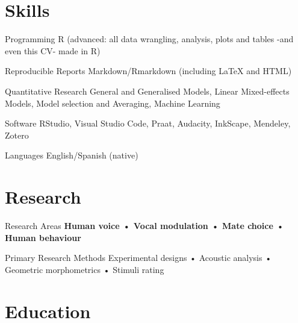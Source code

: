 \documentclass[11pt,a4paper,]{awesome-cv}
\begin{document}
\hypertarget{skills}{%
\section{Skills}\label{skills}}

\begin{cvskills}
  \cvskill
    {Programming}
    {R (advanced: all data wrangling, analysis, plots and tables -and even this CV- made in R)}

  \cvskill
    {Reproducible Reports}
    {Markdown/Rmarkdown (including {\selectfont\LaTeX} and HTML)}

  \cvskill
    {Quantitative Research}
    {General and Generalised Models, Linear Mixed-effects Models, Model selection and Averaging, Machine Learning}

  \cvskill
    {Software}
    {RStudio, Visual Studio Code, Praat, Audacity, InkScape, Mendeley, Zotero}

  \cvskill
    {Languages}
    {English/Spanish (native)}
\end{cvskills}

\hypertarget{research}{%
\section{Research}\label{research}}

\begin{cvskills}
  \cvskill
    {Research Areas}
    {\textbf{Human voice • Vocal modulation • Mate choice • Human behaviour}}

  \cvskill
    {Primary Research Methods}
    {Experimental designs • Acoustic analysis • Geometric morphometrics • Stimuli rating}
\end{cvskills}

\hypertarget{education}{%
\section{Education}\label{education}}
\end{document}
